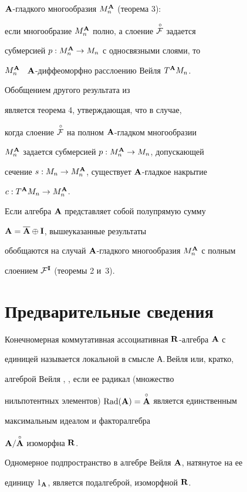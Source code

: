 ${\bold A}$-гладкого многообразия $M^{\bold A}_n$ (теорема 3):


если многообразие $M^{\bold A}_n$ полно, а слоение $\overset{\,\circ}{\cal F}{}$ задается


субмерсией $p:M^{\bold A}_n\to M_n$ с односвязными слоями, то


$M^{\bold A}_n$ \ ${\bold A}$-диффеоморфно расслоению Вейля $T^{\bold A} M_n$.


Обобщением другого результата из 


\cite{Cr-T} является теорема 4, утверждающая, что в случае,


когда слоение $\overset{\,\circ}{\cal F}{}$ на полном ${\bold A}$-гладком многообразии


$M^{\bold A}_n$ задается субмерсией $p:M^{\bold A}_n\to M_n$, допускающей


сечение $s:M_n\to M^{\bold A}_n$, существует ${\bold A}$-гладкое накрытие


$c:T^{\bold A} M_n\to M^{\bold A}_n$.


 


Если алгебра ${\bold A}$ представляет собой полупрямую сумму


${\bold A}=\overline{{\bold A}}\oplus{\bold I}$, вышеуказанные результаты


обобщаются на случай ${\bold A}$-гладкого многообразия $M^{\bold A}_n$ с полным


слоением ${\cal F}^{\bold I}$ (теоремы 2 и~3).


 





\section{Предварительные сведения}


 


 


Конечномерная коммутативная ассоциативная ${\bold R}$-алгебра ${\bold A}$ с


единицей называется локальной в смысле А.\,Вейля или, кратко,


алгеброй Вейля \cite{Weil}, \cite{KMS}, если ее радикал (множество


нильпотентных элементов) $\operatorname{Rad}({\bold A})=\overset{\circ}{\bold A}{}$ является единственным


максимальным идеалом и факторалгебра


${\bold A}/{\overset{\circ}{\bold A}{}}$ изоморфна ${\bold R}$.


Одномерное подпространство в алгебре Вейля ${\bold A}$, натянутое на ее


единицу $1_{\bold A}$, является подалгеброй, изоморфной ${\bold R}$.


